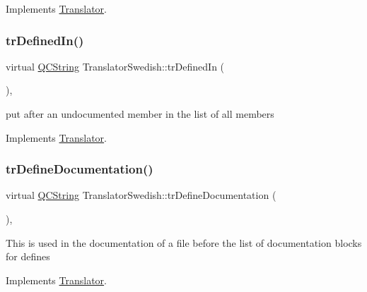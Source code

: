 Implements \mbox{\hyperlink{class_translator}{Translator}}.

\mbox{\label{class_translator_swedish_a3dced1ce5ac235e0b97b5798b1e6d0b5}} 
\subsubsection{\texorpdfstring{trDefinedIn()}{trDefinedIn()}}
{\footnotesize\ttfamily virtual \mbox{\hyperlink{class_q_c_string}{Q\+C\+String}} Translator\+Swedish\+::tr\+Defined\+In (\begin{DoxyParamCaption}{ }\end{DoxyParamCaption})\hspace{0.3cm}{\ttfamily [inline]}, {\ttfamily [virtual]}}

put after an undocumented member in the list of all members 

Implements \mbox{\hyperlink{class_translator}{Translator}}.

\mbox{\label{class_translator_swedish_a0bd5904b71e1ca86e98c782a65ec825c}} 
\subsubsection{\texorpdfstring{trDefineDocumentation()}{trDefineDocumentation()}}
{\footnotesize\ttfamily virtual \mbox{\hyperlink{class_q_c_string}{Q\+C\+String}} Translator\+Swedish\+::tr\+Define\+Documentation (\begin{DoxyParamCaption}{ }\end{DoxyParamCaption})\hspace{0.3cm}{\ttfamily [inline]}, {\ttfamily [virtual]}}

This is used in the documentation of a file before the list of documentation blocks for defines 

Implements \mbox{\hyperlink{class_translator}{Translator}}.

\mbox{\label{class_translator_swedish_a980b41b6c16095ee13b388dc15b25e18}} 
